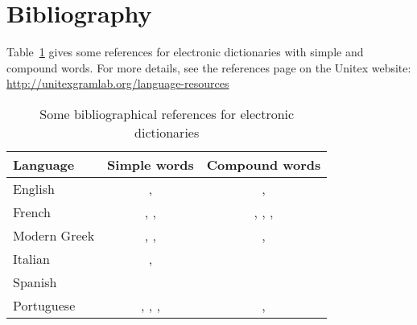 \section{Bibliography}


Table~\ref{ref-dicos} gives some references for electronic dictionaries with simple and 
compound words. For more details, see the references page on the Unitex website: \\
\url{http://unitexgramlab.org/language-resources}

\begin{table}[!ht]
\begin{center}
\begin{tabular}{|l|c|c|}
\hline
\textbf{Language} & \textbf{Simple words} & \textbf{Compound words} \\
\hline
English & \cite{klarsfeld}, \cite{monceaux-1995} & \cite{delac-anglais},
\cite{these-Savary} \\
\hline
French & \cite{formes-ambigues}, \cite{dicos-francais}, \cite{jacques-1995} & \cite{dicos-francais},
\cite{Gross96},
\cite{max-1993},
\cite{syntaxe-de-ladverbe} \\
\hline
Modern Greek & \cite{modern-greek}, \cite{matthieu-anastasia}, \cite{these-tita} & \cite{tita-2002},
\cite{anastasia-2002} \\
\hline
Italian & \cite{delaf-italien}, \cite{delaf-italien-book} & \cite{composes-italien} \\
\hline
Spanish & \cite{blanco-2000} & \cite{blanco-1997} \\
\hline
Portuguese & \cite{eleuterio1995}, \cite{ranchhod1996b}, \cite{ranchhodd1998},
\cite{muniz2005} & \cite{ranchhod1991}, \cite{ranchhodd1998} \\
\hline
\end{tabular}
\caption{Some bibliographical references for electronic dictionaries\label{ref-dicos}}
\end{center}
\end{table}
